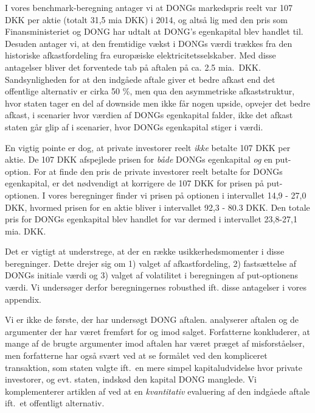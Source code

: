 \documentclass{article}
\begin{document}
I vores benchmark-beregning antager vi at DONGs markedspris reelt var 107 DKK per aktie (totalt 31,5 mia DKK) i 2014, og altså lig med den pris som  Finansministeriet og DONG har udtalt at DONG's egenkapital blev handlet til. Desuden antager vi, at den fremtidige vækst i DONGs værdi trækkes fra den historiske afkastfordeling fra europæiske elektricitetsselskaber. Med disse antagelser bliver det forventede tab på aftalen på ca. 2.5 mia.\ DKK. Sandsynligheden for at den indgåede aftale giver et bedre afkast end det offentlige alternativ er cirka 50 \%, men qua den asymmetriske afkaststruktur, hvor staten tager en del af downside men ikke får nogen upside, opvejer det bedre afkast, i scenarier hvor værdien af DONGs egenkapital falder, ikke det afkast staten går glip af i  scenarier, hvor DONGs egenkapital stiger i værdi.

En vigtig pointe er dog, at private investorer reelt \emph{ikke} betalte 107 DKK per aktie. De 107 DKK afspejlede prisen for \emph{både} DONGs egenkapital \emph{og} en put-option. For at finde den pris de private investorer reelt betalte for DONGs egenkapital, er det nødvendigt at korrigere de 107 DKK for prisen på put-optionen. I vores beregninger finder vi prisen på optionen i intervallet 14,9 - 27,0 DKK, hvormed prisen for en aktie bliver i intervallet 92,3 - 80.3 DKK. Den totale pris for DONGs egenkapital blev handlet for var dermed i intervallet 23,8-27,1 mia. DKK.

Det er vigtigt at understrege, at der en række usikkerhedsmomenter i disse beregninger. Dette drejer sig om 1) valget af afkastfordeling, 2) fastsættelse af DONGs initiale værdi og 3) valget af volatilitet i beregningen af put-optionens værdi. Vi undersøger derfor beregningernes robusthed ift. disse antagelser i vores appendix.

Vi er ikke de første, der har undersøgt DONG aftalen. \cite{Bachman2014} analyserer aftalen og de argumenter der har været fremført for og imod salget. Forfatterne konkluderer, at mange af de brugte argumenter imod aftalen har været præget af misforståelser, men forfatterne har også svært ved at se formålet ved den kompliceret transaktion, som staten valgte ift.\ en mere simpel kapitaludvidelse hvor private investorer, og evt. staten, indskød den kapital DONG manglede. Vi komplementerer artiklen af \cite{Bachman2014} ved at en \emph{kvantitativ} evaluering af den indgåede aftale ift.\ et offentligt alternativ. %
\end{document}
